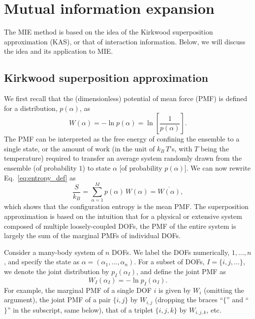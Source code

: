 \documentclass[reprint, superscriptaddress]{revtex4-1}
\begin{document}
\appendix

\section{\label{sec:MIE_review}
Mutual information expansion}

The MIE method is based on the idea of
the Kirkwood superposition approximation (KAS)\cite{kirkwood1935, born1946},
or that of interaction information\cite{mcgill1954}.
%
Below, we will discuss the idea and its application to MIE.

\subsection{\label{sec:Kirkwood}
Kirkwood superposition approximation}

We first recall that the (dimensionless) potential of mean force (PMF)
is defined for a distribution, $p(\alpha)$,
as
$$
W(\alpha) = -\ln p(\alpha) = \ln\left[ \frac{1}{p(\alpha)} \right].
$$
The PMF can be interpreted as
the free energy of confining the ensemble to a single state,
or the amount of work
(in the unit of $k_B \, T$'s, with $T$ being the temperature)
required to transfer an average system randomly drawn from the ensemble (of probability $1$)
to state $\alpha$ [of probability $p(\alpha)$].
%
We can now rewrite Eq.~\eqref{eq:entropy_def} as
%
\begin{equation}
  \frac{S}{k_B}
  =
  \sum_{\alpha = 1}^M p(\alpha) \, W(\alpha)
  =
  \overline{ W(\alpha) }
  ,
  \label{eq:S_W}
\end{equation}
%
which shows that the configuration entropy
is the mean PMF.
%
The superposition approximation is based on the intuition
that for a physical or extensive system composed of
multiple loosely-coupled DOFs,
the PMF of the entire system is largely
the sum of the marginal PMFs of individual DOFs.

Consider a many-body system of $n$ DOFs.
%
We label the DOFs numerically, $1, \dots, n$,
and specify the state as $\alpha = (\alpha_1, \dots, \alpha_n)$.
%
%
For a subset of DOFs, $I = \{i, j, \dots\}$,
we denote the joint distribution by $p_I(\alpha_I)$,
and define the joint PMF as
%
\begin{equation}
  W_I(\alpha_I) = -\ln p_I(\alpha_I)
  .
  \label{eq:WI_def}
\end{equation}
%
For example,
the marginal PMF of a single DOF $i$ is given by $W_i$ (omitting the argument),
the joint PMF of a pair $\{i, j\}$ by $W_{i, j}$
(dropping the braces ``$\{$'' and ``$\}$'' in the subscript, same below),
that of a triplet $\{i, j, k\}$ by $W_{i, j, k}$, etc.
\end{document}
